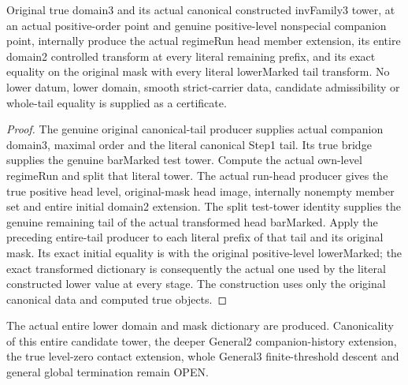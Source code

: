 \begin{theorem}
\label{hir:member-tail-actual-general-three-consumer}
\leanok
Original true domain3 and its actual canonical constructed invFamily3 tower,
at an actual positive-order point and genuine positive-level nonspecial
companion point, internally produce the actual regimeRun head member extension,
its entire domain2 controlled transform at every literal remaining prefix, and
its exact equality on the original mask with every literal lowerMarked tail
transform. No lower datum, lower domain, smooth strict-carrier data, candidate
admissibility or whole-tail equality is supplied as a certificate.
\end{theorem}
\begin{proof}
The genuine original canonical-tail producer supplies actual companion domain3,
maximal order and the literal canonical Step1 tail. Its true bridge supplies
the genuine barMarked test tower. Compute the actual own-level regimeRun and
split that literal tower. The actual run-head producer gives the true positive
head level, original-mask head image, internally nonempty member set and entire
initial domain2 extension. The split test-tower identity supplies the genuine
remaining tail of the actual transformed head barMarked. Apply the preceding
entire-tail producer to each literal prefix of that tail and its original mask.
Its exact initial equality is with the original positive-level lowerMarked;
the exact transformed dictionary is consequently the actual one used by the
literal constructed lower value at every stage. The construction uses only the
original canonical data and computed true objects.
\end{proof}

\begin{remark}
The actual entire lower domain and mask dictionary are produced. Canonicality
of this entire candidate tower, the deeper General2 companion-history extension,
the true level-zero contact extension, whole General3 finite-threshold descent
and general global termination remain OPEN.
\end{remark}
